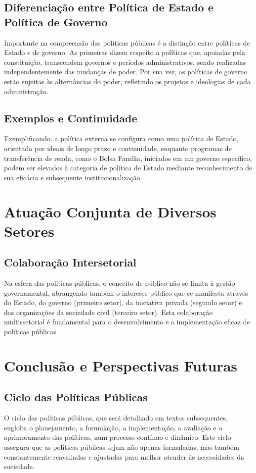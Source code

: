 \documentclass[
   article,       
   12pt,          
   oneside,       
   a4paper,       
   english,       
   brazil,        
   sumario=tradicional
   ]{abntex2}
\begin{document}
\subsection{Diferenciação entre Política de Estado e Política de Governo}
Importante na compreensão das políticas públicas é a distinção entre políticas de Estado e de governo. As primeiras dizem respeito a políticas que, apoiadas pela constituição, transcendem governos e períodos administrativos, sendo realizadas independentemente das mudanças de poder. Por sua vez, as políticas de governo estão sujeitas às alternâncias do poder, refletindo os projetos e ideologias de cada administração.

\subsection{Exemplos e Continuidade}
Exemplificando, a política externa se configura como uma política de Estado, orientada por ideais de longo prazo e continuidade, enquanto programas de transferência de renda, como o Bolsa Família, iniciados em um governo específico, podem ser elevados à categoria de política de Estado mediante reconhecimento de sua eficácia e subsequente institucionalização.

\section{Atuação Conjunta de Diversos Setores}
\subsection{Colaboração Intersetorial}
Na esfera das políticas públicas, o conceito de público não se limita à gestão governamental, abrangendo também o interesse público que se manifesta através do Estado, do governo (primeiro setor), da iniciativa privada (segundo setor) e das organizações da sociedade civil (terceiro setor). Esta colaboração multissetorial é fundamental para o desenvolvimento e a implementação eficaz de políticas públicas.

\section{Conclusão e Perspectivas Futuras}
\subsection{Ciclo das Políticas Públicas}
O ciclo das políticas públicas, que será detalhado em textos subsequentes, engloba o planejamento, a formulação, a implementação, a avaliação e o aprimoramento das políticas, num processo contínuo e dinâmico. Este ciclo assegura que as políticas públicas sejam não apenas formuladas, mas também constantemente reavaliadas e ajustadas para melhor atender às necessidades da sociedade.
\end{document}
